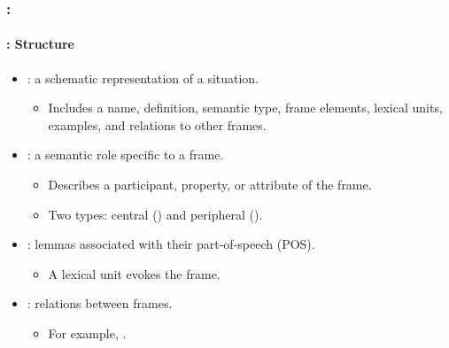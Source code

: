 \documentclass[xcolor=table]{beamer}
\begin{document}
\begin{frame}
	\frametitle{\insertshortsubtitle: \insertsection}
	\framesubtitle{\insertsubsection: Structure}
	
	\begin{itemize}
		\item {}: a schematic representation of a situation.
		\begin{itemize}
			\item Includes a name, definition, semantic type, frame elements, lexical units, examples, and relations to other frames.
		\end{itemize}
		
		\item {}: a semantic role specific to a frame. 
		\begin{itemize}
			\item Describes a participant, property, or attribute of the frame.
			\item Two types: central () and peripheral ().
		\end{itemize}
		
		\item {}: lemmas associated with their part-of-speech (POS).
		\begin{itemize}
			\item A lexical unit evokes the frame.
		\end{itemize}
		
		\item {}: relations between frames.
		\begin{itemize}
			\item For example, .
		\end{itemize}
	\end{itemize}
	
\end{frame}
\end{document}
